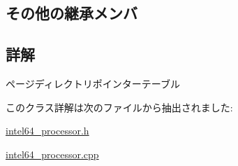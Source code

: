 \subsection*{その他の継承メンバ}


\subsection{詳解}
ページディレクトリポインターテーブル 

このクラス詳解は次のファイルから抽出されました\+:\begin{DoxyCompactItemize}
\item 
\hyperlink{intel64__processor_8h}{intel64\+\_\+processor.\+h}\item 
\hyperlink{intel64__processor_8cpp}{intel64\+\_\+processor.\+cpp}\end{DoxyCompactItemize}
